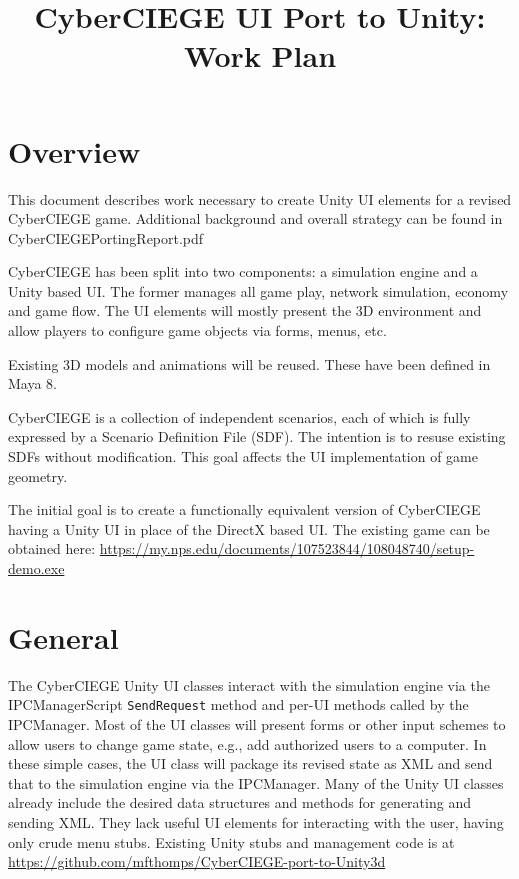 \documentclass{article}
\title{CyberCIEGE UI Port to Unity: Work Plan}
\begin{document}
\maketitle
\raggedright
\setlength{\parindent}{1.0cm} %
\setlength{\parskip}{0.2cm} %

\section {Overview}
This document describes work necessary to create Unity UI elements for a revised CyberCIEGE game.
Additional background and overall strategy can be found in CyberCIEGEPortingReport.pdf 

CyberCIEGE has been split into two components: a simulation engine and a Unity based UI.  The former
manages all game play, network simulation, economy and game flow.  The UI elements will mostly present the 
3D environment and allow players to configure game objects via forms, menus, etc.

Existing 3D models and animations will be reused.  These have been defined in Maya 8.

CyberCIEGE is a collection of independent scenarios, each of which is fully expressed by a Scenario Definition File (SDF).
The intention is to resuse existing SDFs without modification.  This goal affects the UI implementation of game
geometry.

The initial goal is to create a functionally equivalent version of CyberCIEGE having a Unity UI in place of the
DirectX based UI.  The existing game can be obtained here: \newline
\url{https://my.nps.edu/documents/107523844/108048740/setup-demo.exe}

\section{General}
The CyberCIEGE Unity UI classes interact with the simulation engine via the IPCManagerScript {\tt SendRequest} method
and per-UI methods called by the IPCManager.  Most of the UI classes will present 
forms or other input schemes to allow users to change game state, e.g., add authorized users to a computer.  In these simple cases,
the UI class will package its revised state as XML and send that to the simulation engine via the 
IPCManager.  Many of the Unity UI classes already
include the desired data structures and methods for generating and sending XML.  
They lack useful UI elements for interacting with the user,
having only crude menu stubs.
Existing Unity stubs and management code is at \linebreak \url{https://github.com/mfthomps/CyberCIEGE-port-to-Unity3d}
\linebreak
\end{document}
